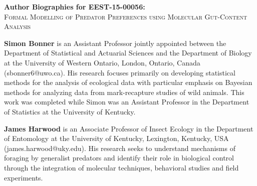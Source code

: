 \documentclass[12pt]{article}
\begin{document}
\begin{center}
  \begin{Large}
    \textbf{Author Biographies for EEST-15-00056:}\\
    \textsc{Formal Modelling of Predator Preferences using Molecular Gut-Content
      Analysis}
  \end{Large}
\end{center}

\textbf{Simon Bonner} is an Assistant Professor jointly appointed between the Department of Statistical and Actuarial Sciences and the Department of Biology at the University of Western Ontario, London, Ontario, Canada (sbonner6@uwo.ca). His research focuses primarily on developing statistical methods for the analysis of ecological data with particular emphasis on Bayesian methods for analyzing data from mark-recapture studies of wild animals. This work was completed while Simon was an Assistant Professor in the Department of Statistics at the University of Kentucky.

\textbf{James Harwood} is an Associate Professor of Insect Ecology in the Department of Entomology at the University of Kentucky, Lexington, Kentucky, USA (james.harwood@uky.edu). His research seeks to understand mechanisms of foraging by generalist predators and identify their role in biological control through the integration of molecular techniques, behavioral studies and field experiments.
\end{document}
